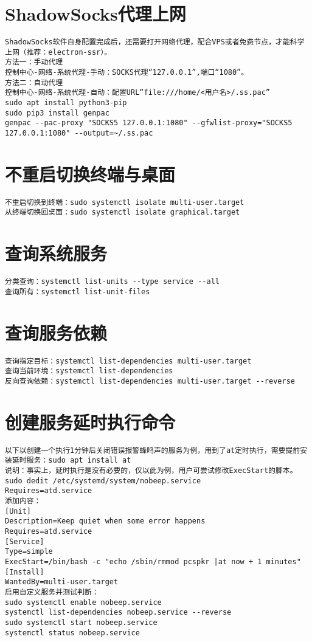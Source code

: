 \documentclass[a4paper,fontset=fandol,zihao=-4,linespread=1.2]{ctexbook}
\begin{document}
\section{ShadowSocks代理上网}
\begin{lstlisting}
ShadowSocks软件自身配置完成后，还需要打开网络代理，配合VPS或者免费节点，才能科学上网（推荐：electron-ssr）。
方法一：手动代理
控制中心-网络-系统代理-手动：SOCKS代理“127.0.0.1”,端口“1080”。
方法二：自动代理
控制中心-网络-系统代理-自动：配置URL“file:///home/<用户名>/.ss.pac”
sudo apt install python3-pip
sudo pip3 install genpac
genpac --pac-proxy "SOCKS5 127.0.0.1:1080" --gfwlist-proxy="SOCKS5 127.0.0.1:1080" --output=~/.ss.pac
\end{lstlisting}

\section{不重启切换终端与桌面}
\begin{lstlisting}
不重启切换到终端：sudo systemctl isolate multi-user.target
从终端切换回桌面：sudo systemctl isolate graphical.target
\end{lstlisting}

\section{查询系统服务}
\begin{lstlisting}
分类查询：systemctl list-units --type service --all
查询所有：systemctl list-unit-files
\end{lstlisting}

\section{查询服务依赖}
\begin{lstlisting}
查询指定目标：systemctl list-dependencies multi-user.target
查询当前环境：systemctl list-dependencies
反向查询依赖：systemctl list-dependencies multi-user.target --reverse
\end{lstlisting}

\section{创建服务延时执行命令}
\begin{lstlisting}
以下以创建一个执行1分钟后关闭错误报警蜂鸣声的服务为例，用到了at定时执行，需要提前安装延时服务：sudo apt install at
说明：事实上，延时执行是没有必要的，仅以此为例，用户可尝试修改ExecStart的脚本。
sudo dedit /etc/systemd/system/nobeep.service
Requires=atd.service
添加内容：
[Unit]
Description=Keep quiet when some error happens
Requires=atd.service
[Service]
Type=simple
ExecStart=/bin/bash -c "echo /sbin/rmmod pcspkr |at now + 1 minutes"
[Install]
WantedBy=multi-user.target
启用自定义服务并测试判断：
sudo systemctl enable nobeep.service
systemctl list-dependencies nobeep.service --reverse
sudo systemctl start nobeep.service
systemctl status nobeep.service
\end{lstlisting}
\end{document}
